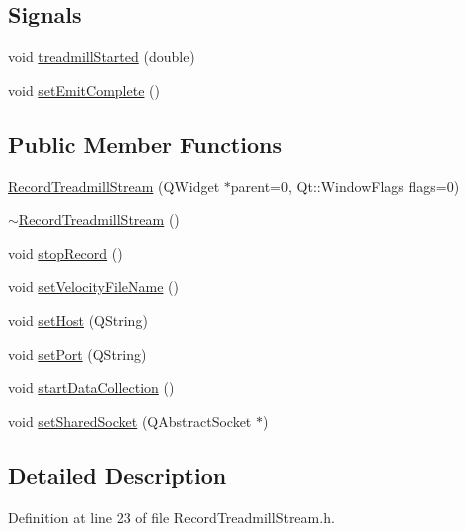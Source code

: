\subsection*{Signals}
\begin{DoxyCompactItemize}
\item 
void \hyperlink{class_record_treadmill_stream_afa610ced919405446a8bd28910a9a65e}{treadmill\+Started} (double)
\item 
void \hyperlink{class_record_treadmill_stream_a5eb6b44556167062b6679e4f5f265a99}{set\+Emit\+Complete} ()
\end{DoxyCompactItemize}
\subsection*{Public Member Functions}
\begin{DoxyCompactItemize}
\item 
\hyperlink{class_record_treadmill_stream_a9f7cf4be9ae3b7d79be61dd0f6c7e6b7}{Record\+Treadmill\+Stream} (Q\+Widget $\ast$parent=0, Qt\+::\+Window\+Flags flags=0)
\item 
\hyperlink{class_record_treadmill_stream_a785402b02e623529c8728acac59c1f7c}{$\sim$\+Record\+Treadmill\+Stream} ()
\item 
void \hyperlink{class_record_treadmill_stream_a6829046db76436c6298b1cd21f33b6e7}{stop\+Record} ()
\item 
void \hyperlink{class_record_treadmill_stream_a8160b81706a250149d14680700bc5b85}{set\+Velocity\+File\+Name} ()
\item 
void \hyperlink{class_record_treadmill_stream_a730f24f651775d7499b43dd58cf72379}{set\+Host} (Q\+String)
\item 
void \hyperlink{class_record_treadmill_stream_ae16198d0acd13cb4fa401ae1d00e2282}{set\+Port} (Q\+String)
\item 
void \hyperlink{class_record_treadmill_stream_a058913f2f5796ef722ee0270382cf5a4}{start\+Data\+Collection} ()
\item 
void \hyperlink{class_record_treadmill_stream_a58798d23f74b7a9e067020a9cc404908}{set\+Shared\+Socket} (Q\+Abstract\+Socket $\ast$)
\end{DoxyCompactItemize}


\subsection{Detailed Description}


Definition at line 23 of file Record\+Treadmill\+Stream.\+h.



